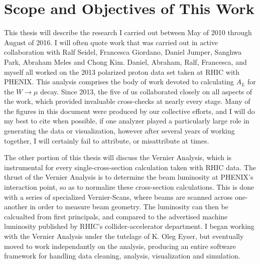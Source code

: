 \section{Scope and Objectives of This Work}
This thesis will describe the research I carried out between May of 2010 through
August of 2016. I will often quote work that was carried out in active
collaboration with Ralf Seidel, Francesca Giordano, Daniel Jumper, Sanghwa Park,
Abraham Meles and Chong Kim. Daniel, Abraham, Ralf, Francesca, and myself all
worked on the 2013 polarized proton data set taken at RHIC with PHENIX. This
analysis comprises the body of work devoted to calculating $A_L$ for the
$W\rightarrow\mu$ decay. Since 2013, the five of us collaborated closely on all
aspects of the work, which provided invaluable cross-checks at nearly every
stage. Many of the figures in this document were produced by our collective
efforts, and I will do my best to cite when possible, if one analyzer played a
particularly large role in generating the data or visualization, however after
several years of working together, I will certainly fail to attribute, or
misattribute at times.

The other portion of this thesis will discuss the Vernier Analysis, which is
instrumental for every single-cross-section calculation taken with RHIC data.
The thrust of the Vernier Analysis is to determine the beam luminosity at
PHENIX's interaction point, so as to normalize these cross-section calculations.
This is done with a series of specialized Vernier-Scans, where beams are scanned
across one-another in order to measure beam geometry. The luminosity can then be
calcualted from first principals, and compared to the advertised machine
luminosity published by RHIC's collider-accelerator department. I began working
with the Vernier Analysis under the tutelage of K. Oleg Eyser, but eventually
moved to work independantly on the analysis, producing an entire software
framework for handling data cleaning, analysis, visualization and simulation.
